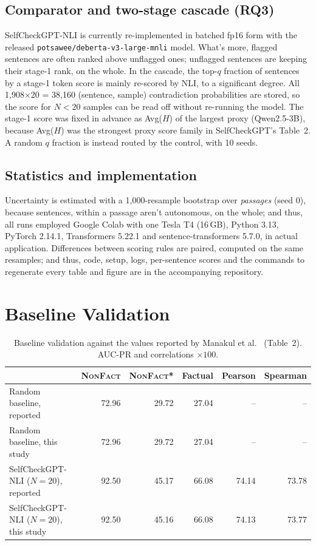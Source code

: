 \documentclass[acmsmall,screen,review,nonacm]{acmart}
\newcommand{\nf}{\textsc{NonFact}}
\begin{document}
\subsection{Comparator and two-stage cascade (RQ3)}
SelfCheckGPT-NLI is currently re-implemented in batched fp16 form with the released \nolinkurl{potsawee/deberta-v3-large-mnli} model. What's more, flagged sentences are often ranked above unflagged ones; unflagged sentences are keeping their stage-1 rank, on the whole. In the cascade, the top-$q$ fraction of sentences by a stage-1 token score is mainly re-scored by NLI, to a significant degree. All 1{,}908$\times$20 = 38{,}160 (sentence, sample) contradiction probabilities are stored, so the score for $N<20$ samples can be read off without re-running the model. The stage-1 score was fixed in advance as Avg($H$) of the largest proxy (Qwen2.5-3B), because Avg($H$) was the strongest proxy score family in SelfCheckGPT's Table~2. A random $q$ fraction is instead routed by the control, with 10 seeds.

\subsection{Statistics and implementation}
Uncertainty is estimated with a 1{,}000-resample bootstrap over \emph{passages} (seed 0), because sentences, within a passage aren't autonomous, on the whole; and thus, all runs employed Google Colab with one Tesla T4 (16\,GB), Python 3.13, PyTorch 2.14.1, Transformers 5.22.1 and sentence-transformers 5.7.0, in actual application. Differences between scoring rules are paired, computed on the same resamples; and thus, code, setup, logs, per-sentence scores and the commands to regenerate every table and figure are in the accompanying repository.

\section{Baseline Validation}
\label{sec:validation}

\begin{table}[t]
  \caption{Baseline validation against the values reported by Manakul et al.~\cite{manakul2023selfcheckgpt} (Table~2). AUC-PR and correlations $\times 100$.}
  \label{tab:validation}
  \footnotesize
  \begin{tabular}{lrrrrr}
    \toprule
    & \nf{} & \nf{}* & Factual & Pearson & Spearman \\
    \midrule
    Random baseline, reported & 72.96 & 29.72 & 27.04 & -- & -- \\
    Random baseline, this study & 72.96 & 29.72 & 27.04 & -- & -- \\
    SelfCheckGPT-NLI ($N{=}20$), reported & 92.50 & 45.17 & 66.08 & 74.14 & 73.78 \\
    SelfCheckGPT-NLI ($N{=}20$), this study & 92.50 & 45.16 & 66.08 & 74.13 & 73.77 \\
    \bottomrule
  \end{tabular}
\end{table}
\end{document}
